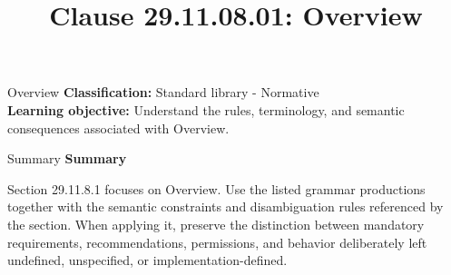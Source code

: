 \documentclass[10pt,letterpaper]{article}
\title{Clause 29.11.08.01: Overview}
\author{}
\date{}
\begin{document}
\maketitle
\begin{CornellOverviewBox}{Overview}
\textbf{Classification:} Standard library - Normative\\[2pt]
\textbf{Learning objective:} Understand the rules, terminology, and semantic consequences associated with Overview.
\end{CornellOverviewBox}\begin{CornellSummaryBox}{Summary}
{\sffamily\bfseries\color{Accent} Summary}\par\vspace{3pt}Section 29.11.8.1 focuses on Overview. Use the listed grammar productions together with the semantic constraints and disambiguation rules referenced by the section. When applying it, preserve the distinction between mandatory requirements, recommendations, permissions, and behavior deliberately left undefined, unspecified, or implementation-defined.
\end{CornellSummaryBox}
\end{document}
